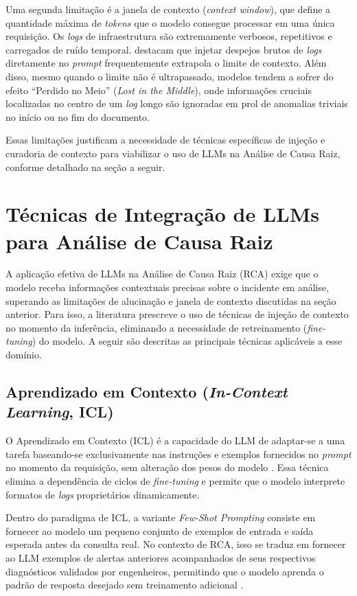 Uma segunda limitação é a janela de contexto (\textit{context window}), que define a quantidade máxima de \textit{tokens} que o modelo consegue processar em uma única requisição. Os \textit{logs} de infraestrutura são extremamente verbosos, repetitivos e carregados de ruído temporal.  destacam que injetar despejos brutos de \textit{logs} diretamente no \textit{prompt} frequentemente extrapola o limite de contexto. Além disso, mesmo quando o limite não é ultrapassado, modelos tendem a sofrer do efeito ``Perdido no Meio'' (\textit{Lost in the Middle}), onde informações cruciais localizadas no centro de um \textit{log} longo são ignoradas em prol de anomalias triviais no início ou no fim do documento.

Essas limitações justificam a necessidade de técnicas específicas de injeção e curadoria de contexto para viabilizar o uso de LLMs na Análise de Causa Raiz, conforme detalhado na seção a seguir.

\section{Técnicas de Integração de LLMs para Análise de Causa Raiz}
\label{sec:tecnicas_rca}

A aplicação efetiva de LLMs na Análise de Causa Raiz (RCA) exige que o modelo receba informações contextuais precisas sobre o incidente em análise, superando as limitações de alucinação e janela de contexto discutidas na seção anterior. Para isso, a literatura prescreve o uso de técnicas de injeção de contexto no momento da inferência, eliminando a necessidade de retreinamento (\textit{fine-tuning}) do modelo. A seguir são descritas as principais técnicas aplicáveis a esse domínio.

\subsection{Aprendizado em Contexto (\textit{In-Context Learning}, ICL)}

O Aprendizado em Contexto (ICL) é a capacidade do LLM de adaptar-se a uma tarefa baseando-se exclusivamente nas instruções e exemplos fornecidos no \textit{prompt} no momento da requisição, sem alteração dos pesos do modelo \cite{brown2020language}. Essa técnica elimina a dependência de ciclos de \textit{fine-tuning} e permite que o modelo interprete formatos de \textit{logs} proprietários dinamicamente.

Dentro do paradigma de ICL, a variante \textit{Few-Shot Prompting} consiste em fornecer ao modelo um pequeno conjunto de exemplos de entrada e saída esperada antes da consulta real. No contexto de RCA, isso se traduz em fornecer ao LLM exemplos de alertas anteriores acompanhados de seus respectivos diagnósticos validados por engenheiros, permitindo que o modelo aprenda o padrão de resposta desejado sem treinamento adicional \cite{brown2020language}.

